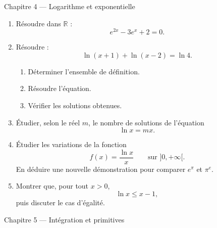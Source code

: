 \documentclass[11pt,a4paper]{article}
\newcommand{\R}{\mathbb{R}}
\begin{document}
\begin{chapitrebox}{Chapitre 4 --- Logarithme et exponentielle}
\end{chapitrebox}

\begin{enumerate}[label=\textbf{Exercice \arabic*.}, leftmargin=*, itemsep=1em]

\item Résoudre dans \(\R\) :
\[
e^{2x}-3e^x+2=0.
\]

\item Résoudre :
\[
\ln(x+1)+\ln(x-2)=\ln 4.
\]

\begin{enumerate}[label=\alph*)]
    \item Déterminer l'ensemble de définition.
    \item Résoudre l'équation.
    \item Vérifier les solutions obtenues.
\end{enumerate}

\item Étudier, selon le réel \(m\), le nombre de solutions de l'équation
\[
\ln x=mx.
\]

\item Étudier les variations de la fonction
\[
f(x)=\frac{\ln x}{x}
\qquad \text{sur } ]0,+\infty[.
\]
En déduire une nouvelle démonstration pour comparer \(e^\pi\) et \(\pi^e\).

\item Montrer que, pour tout \(x>0\),
\[
\ln x\leq x-1,
\]
puis discuter le cas d'égalité.

\end{enumerate}

\begin{chapitrebox}{Chapitre 5 --- Intégration et primitives}
\end{chapitrebox}
\end{document}
